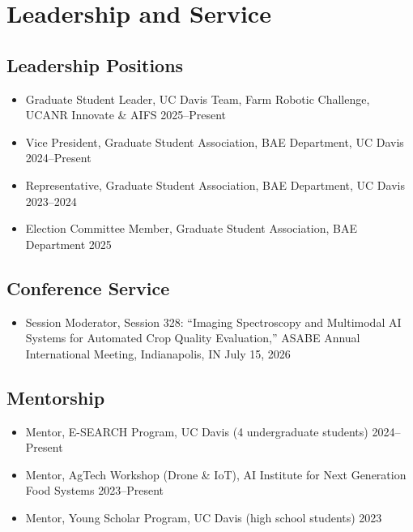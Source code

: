 \documentclass[11pt,a4paper]{article}
\begin{document}
\section{Leadership and Service}

\subsection{Leadership Positions}
\begin{itemize}
    \item Graduate Student Leader, UC Davis Team, Farm Robotic Challenge, UCANR Innovate \& AIFS \hfill 2025--Present
    \item Vice President, Graduate Student Association, BAE Department, UC Davis \hfill 2024--Present
    \item Representative, Graduate Student Association, BAE Department, UC Davis \hfill 2023--2024
    \item Election Committee Member, Graduate Student Association, BAE Department \hfill 2025
\end{itemize}

\subsection{Conference Service}
\begin{itemize}
    \item Session Moderator, Session 328: ``Imaging Spectroscopy and Multimodal AI Systems for Automated Crop Quality Evaluation,'' ASABE Annual International Meeting, Indianapolis, IN \hfill July 15, 2026
\end{itemize}

\subsection{Mentorship}
\begin{itemize}
    \item Mentor, E-SEARCH Program, UC Davis (4 undergraduate students) \hfill 2024--Present
    \item Mentor, AgTech Workshop (Drone \& IoT), AI Institute for Next Generation Food Systems \hfill 2023--Present
    \item Mentor, Young Scholar Program, UC Davis (high school students) \hfill 2023
\end{itemize}
\end{document}
